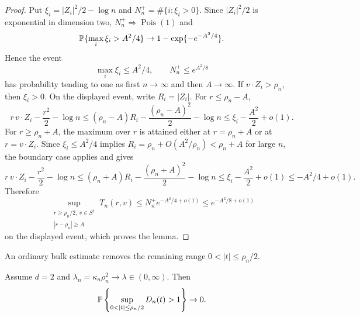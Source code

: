 \begin{proof}
Put \(\xi_i=|Z_i|^2/2-\log n\) and \(N_n^+=\#\{i:\xi_i>0\}\).  Since
\(|Z_i|^2/2\) is exponential in dimension two, \(N_n^+\Rightarrow
\operatorname{Pois}(1)\) and
\[
    \mathbb P\{\max_i\xi_i>A^2/4\}\to 1-\exp\{-e^{-A^2/4}\}.
\]
Hence the event
\[
    \max_i\xi_i\le A^2/4,\qquad N_n^+\le e^{A^2/8}
\]
has probability tending to one as first \(n\to\infty\) and then
\(A\to\infty\).  If \(v\cdot Z_i>\rho_n\), then \(\xi_i>0\).  On the
displayed event, write \(R_i=|Z_i|\).  For \(r\le\rho_n-A\),
\[
    r\,v\cdot Z_i-\frac{r^2}{2}-\log n
    \le
    (\rho_n-A)R_i-\frac{(\rho_n-A)^2}{2}-\log n
    \le
    \xi_i-\frac{A^2}{2}+o(1).
\]
For \(r\ge\rho_n+A\), the maximum over \(r\) is attained either at
\(r=\rho_n+A\) or at \(r=v\cdot Z_i\).  Since \(\xi_i\le A^2/4\) implies
\(R_i=\rho_n+O(A^2/\rho_n)<\rho_n+A\) for large \(n\), the boundary case
applies and gives
\[
    r\,v\cdot Z_i-\frac{r^2}{2}-\log n
    \le
    (\rho_n+A)R_i-\frac{(\rho_n+A)^2}{2}-\log n
    \le
    \xi_i-\frac{A^2}{2}+o(1)
    \le -A^2/4+o(1).
\]
Therefore
\[
    \sup_{\substack{r\ge\rho_n/2,\ v\in S^1\\ |r-\rho_n|\ge A}}
    T_n(r,v)
    \le
    N_n^+e^{-A^2/4+o(1)}
    \le e^{-A^2/8+o(1)}
\]
on the displayed event, which proves the lemma.
\end{proof}

An ordinary bulk estimate removes the remaining range
\(0<|t|\le\rho_n/2\).
\begin{lemma}
\label{lem:d2-bulk-exclusion}
Assume \(d=2\) and \(\lambda_n=\kappa_n\rho_n^2\to\lambda\in(0,\infty)\).
Then
\[
    \Pbb\left\{\sup_{0<|t|\le\rho_n/2}D_n(t)>1\right\}\to0 .
\]
\end{lemma}


